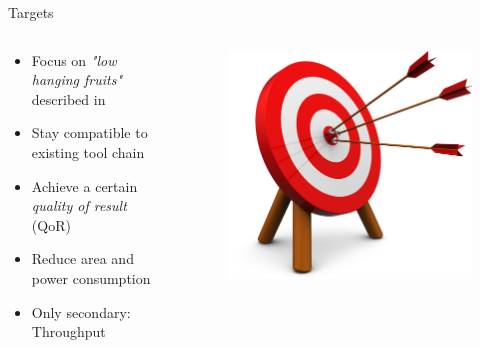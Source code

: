 \documentclass{beamer}
\begin{document}
\begin{frame}{Targets}
\begin {columns}
 \begin{column}{0.7\textwidth}
 
    \begin{itemize}
        \item<1->Focus on \textit{"low hanging fruits"} described in \cite{Mittal:2016:STA:2891449.2893356}
        \item<2->Stay compatible to existing tool chain
        \item<3->Achieve a certain \textit{quality of result} (QoR)
        \item<4->Reduce area and power consumption
        \item<5->Only secondary: Throughput
    \end{itemize}
    
 \end{column}
  \begin{column}{0.3\textwidth}
    \begin{figure}
     \includegraphics[width=\textwidth]{img/target.png}
    \end{figure}
  \end{column}
\end {columns}
\end{frame}
\end{document}
